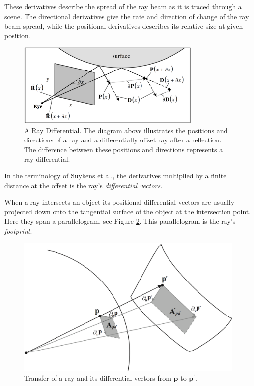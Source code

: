 These derivatives describe the spread of the ray beam as it is traced through a scene. The directional derivatives give the rate and direction of change of the ray beam spread, while the positional derivatives describes its relative size at given position.

\begin{figure}\label{f:first-order-ray-differentials}
\begin{center}
	\includegraphics[width=0.8\textwidth]{graphics/pm/pm-13-2}
\end{center}
	\caption{A Ray Differential. The diagram above illustrates the positions and directions of a ray and a differentially offset ray after a reflection. The difference between these positions and directions represents a ray differential.}
\end{figure}

In the terminology of Suykens et al.\cite{a:Pathdifferentialsandapplications}, the derivatives multiplied by a finite distance at the offset  is the ray's \textit{differential vectors}. 

When a ray intersects an object its positional differential vectors are usually projected down onto the tangential surface of the object at the intersection point. Here they span a parallelogram, see Figure \ref{f:ray-footprint}. This parallelogram is the ray's \textit{footprint}.

\begin{figure}
\sidecaption
	\includegraphics[width=.65\textwidth]{graphics/pm/pm-13-1}
	\caption{Transfer of a ray and its differential vectors from $\mathbf{p}$ to $\mathbf{p}^{'}$.}
	\label{f:ray-footprint}
\end{figure}



